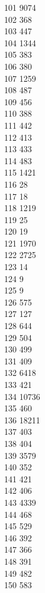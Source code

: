 { 101	9074 \\
 102	368 \\
 103	447 \\
 104	1344 \\
 105	383 \\
 106	380 \\
 107	1259 \\
 108	487 \\
 109	456 \\
 110	388 \\
 111	442 \\
 112	413 \\
 113	433 \\
 114	483 \\
 115	1421 \\
 116	28 \\
 117	18 \\
 118	1219 \\
 119	25 \\
 120	19 \\
 121	1970 \\
 122	2725 \\
 123	14 \\
 124	9 \\
 125	9 \\
 126	575 \\
 127	127 \\
 128	644 \\
 129	504 \\
 130	499 \\
 131	409 \\
 132	6418 \\
 133	421 \\
 134	10736 \\
 135	460 \\
 136	18211 \\
 137	403 \\
 138	404 \\
 139	3579 \\
 140	352 \\
 141	421 \\
 142	406 \\
 143	4339 \\
 144	468 \\
 145	529 \\
 146	392 \\
 147	366 \\
 148	391 \\
 149	482 \\
 150	583 \\
}

